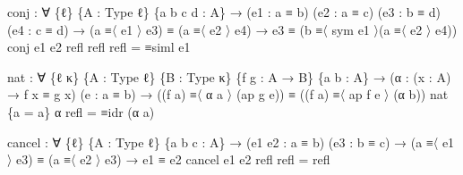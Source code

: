 \documentclass[
  11pt,
  oneside,
  article]{memoir}
\newenvironment{Shaded}{}{}
\newcommand{\NormalTok}[1]{#1}
\newcommand{\OtherTok}[1]{\textcolor[rgb]{0.00,0.44,0.13}{#1}}
\theoremstyle{definition}
\theoremstyle{plain}
\newcommand{\0}{\textsf{0}}
\newcommand{\1}{\tn{\textsf{1}}}
\begin{document}
\begin{Shaded}
\begin{Highlighting}[]
\NormalTok{conj }\OtherTok{:} \OtherTok{∀} \OtherTok{\{}\NormalTok{ℓ}\OtherTok{\}} \OtherTok{\{}\NormalTok{A }\OtherTok{:}\NormalTok{ Type ℓ}\OtherTok{\}} \OtherTok{\{}\NormalTok{a b c d }\OtherTok{:}\NormalTok{ A}\OtherTok{\}}
       \OtherTok{→} \OtherTok{(}\NormalTok{e1 }\OtherTok{:}\NormalTok{ a ≡ b}\OtherTok{)} \OtherTok{(}\NormalTok{e2 }\OtherTok{:}\NormalTok{ a ≡ c}\OtherTok{)} \OtherTok{(}\NormalTok{e3 }\OtherTok{:}\NormalTok{ b ≡ d}\OtherTok{)} \OtherTok{(}\NormalTok{e4 }\OtherTok{:}\NormalTok{ c ≡ d}\OtherTok{)}
       \OtherTok{→} \OtherTok{(}\NormalTok{a ≡〈 e1 〉 e3}\OtherTok{)}\NormalTok{ ≡ }\OtherTok{(}\NormalTok{a ≡〈 e2 〉 e4}\OtherTok{)}
       \OtherTok{→}\NormalTok{ e3 ≡ }\OtherTok{(}\NormalTok{b ≡〈 sym e1 〉}\OtherTok{(}\NormalTok{a ≡〈 e2 〉 e4}\OtherTok{))}
\NormalTok{conj e1 e2 refl refl refl }\OtherTok{=}\NormalTok{ ≡siml e1}

\NormalTok{nat }\OtherTok{:} \OtherTok{∀} \OtherTok{\{}\NormalTok{ℓ κ}\OtherTok{\}} \OtherTok{\{}\NormalTok{A }\OtherTok{:}\NormalTok{ Type ℓ}\OtherTok{\}} \OtherTok{\{}\NormalTok{B }\OtherTok{:}\NormalTok{ Type κ}\OtherTok{\}} \OtherTok{\{}\NormalTok{f g }\OtherTok{:}\NormalTok{ A }\OtherTok{→}\NormalTok{ B}\OtherTok{\}} \OtherTok{\{}\NormalTok{a b }\OtherTok{:}\NormalTok{ A}\OtherTok{\}}
      \OtherTok{→} \OtherTok{(}\NormalTok{α }\OtherTok{:} \OtherTok{(}\NormalTok{x }\OtherTok{:}\NormalTok{ A}\OtherTok{)} \OtherTok{→}\NormalTok{ f x ≡ g x}\OtherTok{)} \OtherTok{(}\NormalTok{e }\OtherTok{:}\NormalTok{ a ≡ b}\OtherTok{)}
      \OtherTok{→} \OtherTok{((}\NormalTok{f a}\OtherTok{)}\NormalTok{ ≡〈 α a 〉 }\OtherTok{(}\NormalTok{ap g e}\OtherTok{))}\NormalTok{ ≡ }\OtherTok{((}\NormalTok{f a}\OtherTok{)}\NormalTok{ ≡〈 ap f e 〉 }\OtherTok{(}\NormalTok{α b}\OtherTok{))}
\NormalTok{nat }\OtherTok{\{}\NormalTok{a }\OtherTok{=}\NormalTok{ a}\OtherTok{\}}\NormalTok{ α refl }\OtherTok{=}\NormalTok{ ≡idr }\OtherTok{(}\NormalTok{α a}\OtherTok{)}

\NormalTok{cancel }\OtherTok{:} \OtherTok{∀} \OtherTok{\{}\NormalTok{ℓ}\OtherTok{\}} \OtherTok{\{}\NormalTok{A }\OtherTok{:}\NormalTok{ Type ℓ}\OtherTok{\}} \OtherTok{\{}\NormalTok{a b c }\OtherTok{:}\NormalTok{ A}\OtherTok{\}}
         \OtherTok{→} \OtherTok{(}\NormalTok{e1 e2 }\OtherTok{:}\NormalTok{ a ≡ b}\OtherTok{)} \OtherTok{(}\NormalTok{e3 }\OtherTok{:}\NormalTok{ b ≡ c}\OtherTok{)}
         \OtherTok{→} \OtherTok{(}\NormalTok{a ≡〈 e1 〉 e3}\OtherTok{)}\NormalTok{ ≡ }\OtherTok{(}\NormalTok{a ≡〈 e2 〉 e3}\OtherTok{)}
         \OtherTok{→}\NormalTok{ e1 ≡ e2}
\NormalTok{cancel e1 e2 refl refl }\OtherTok{=}\NormalTok{ refl}


\end{Highlighting}
\end{Shaded}
\end{document}
